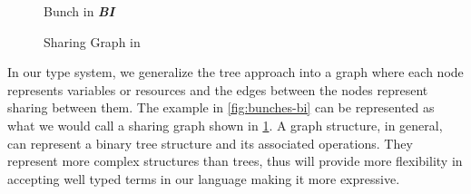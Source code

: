 \begin{figure}[h]
  \begin{framed}
  \begin{minipage}[c]{0.45\linewidth}
  \centering
    \caption{Bunch in \textbf{\em BI}}
    \label{fig:bunches-bi}
  \end{minipage}\hfill%
  \begin{minipage}[c]{0.45\linewidth}
  \centering
    \caption{Sharing Graph in \qub{}}
    \label{fig:sharing-graph}
  \end{minipage}
\end{framed}
\end{figure}

In our type system, we generalize the tree approach into a graph where each node represents variables or resources
and the edges between the nodes represent sharing between them. The example in \cref{fig:bunches-bi} can
be represented as what we would call a sharing graph shown in \cref{fig:sharing-graph}. A graph structure, in general,
can represent a binary tree structure and its associated operations. They represent more complex structures than
trees, thus will provide more flexibility in accepting well typed terms in our language making it more expressive.

